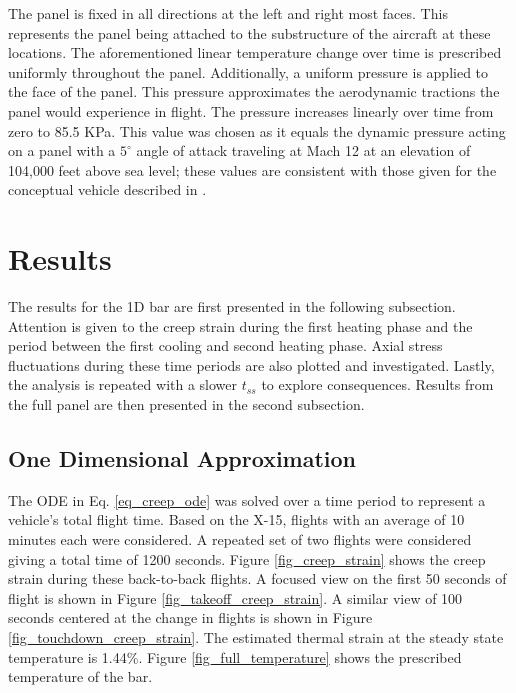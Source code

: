 \documentclass[conf]{new-aiaa}
\begin{document}
\noindent
The panel is fixed in all directions at the left and right most
faces. 
This represents the panel being attached to the substructure of the aircraft
at these locations.
The aforementioned linear temperature change over time is prescribed
uniformly throughout the panel.
Additionally, a uniform pressure is applied to the face of the panel.
This pressure approximates the aerodynamic tractions the 
panel would experience in flight. 
The pressure increases linearly over time from zero to 85.5 KPa. 
This value was chosen as it equals the dynamic pressure
acting on a panel with a $5^{\circ}$ angle of attack
traveling at Mach 12 at an elevation of 104,000 feet above sea level;
these values are consistent with those given
for the conceptual vehicle described in 
\cite{culler_impact_of_FTS_coupling_on_response_prediction_hypersonic_skin_panels}.



\section{Results}

The results for the 1D bar are first presented in the following 
subsection.
Attention is given to the creep strain during the
first heating phase and the period between the
first cooling and second heating phase.
Axial stress fluctuations during these time 
periods are also plotted and investigated.
Lastly, the analysis is repeated with a slower 
$t_{ss}$ to explore consequences. 
Results from the full panel are then presented in the
second subsection.

\subsection{One Dimensional Approximation}
The ODE in Eq. \ref{eq_creep_ode} was solved over a time period to represent a
vehicle's total flight time.
Based on the X-15, flights with an average of 10 minutes each 
\cite{ kordes_structureal_heating_experiencs_on_the_x15_airplane}
were considered.
A repeated set of two flights were considered giving a total time of 1200 seconds.
Figure \ref{fig_creep_strain} shows
the creep strain during these back-to-back flights.
A focused view on the first 50 seconds of flight is shown 
in Figure \ref{fig_takeoff_creep_strain}.
A similar view of 100 seconds centered at the change in flights is 
shown in Figure \ref{fig_touchdown_creep_strain}.
The estimated thermal strain at the steady state temperature is 1.44\%.
Figure \ref{fig_full_temperature} shows the prescribed temperature of the bar.
\end{document}
